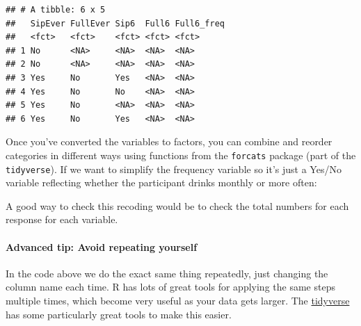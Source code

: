 \documentclass[
]{book}
\newenvironment{Shaded}{\begin{snugshade}}{\end{snugshade}}
\newcommand{\AttributeTok}[1]{\textcolor[rgb]{0.77,0.63,0.00}{#1}}
\newcommand{\FunctionTok}[1]{\textcolor[rgb]{0.00,0.00,0.00}{#1}}
\newcommand{\NormalTok}[1]{#1}
\newcommand{\OtherTok}[1]{\textcolor[rgb]{0.56,0.35,0.01}{#1}}
\newcommand{\SpecialCharTok}[1]{\textcolor[rgb]{0.00,0.00,0.00}{#1}}
\newcommand{\StringTok}[1]{\textcolor[rgb]{0.31,0.60,0.02}{#1}}
\begin{document}
\begin{verbatim}
## # A tibble: 6 x 5
##   SipEver FullEver Sip6  Full6 Full6_freq
##   <fct>   <fct>    <fct> <fct> <fct>     
## 1 No      <NA>     <NA>  <NA>  <NA>      
## 2 No      <NA>     <NA>  <NA>  <NA>      
## 3 Yes     No       Yes   <NA>  <NA>      
## 4 Yes     No       No    <NA>  <NA>      
## 5 Yes     No       <NA>  <NA>  <NA>      
## 6 Yes     No       Yes   <NA>  <NA>
\end{verbatim}

Once you've converted the variables to factors, you can combine
and reorder categories in different ways using functions
from the \texttt{forcats} package (part of the \texttt{tidyverse}). If
we want to simplify the frequency variable so it's just
a Yes/No variable reflecting whether the participant drinks
monthly or more often:

\begin{Shaded}
\end{Shaded}

\begin{note}
A good way to check this recoding would be to check the total numbers
for each response for each variable.
\end{note}

\hypertarget{advanced-tip-avoid-repeating-yourself}{%
\paragraph*{Advanced tip: Avoid repeating yourself}\label{advanced-tip-avoid-repeating-yourself}}

In the code above we do the exact same thing repeatedly,
just changing the column name each time. R has lots of
great tools for applying the same steps multiple times,
which become very useful as your data gets larger.
The \protect\hyperlink{tidyverse}{tidyverse} has some particularly
great tools to make this easier.
\end{document}
